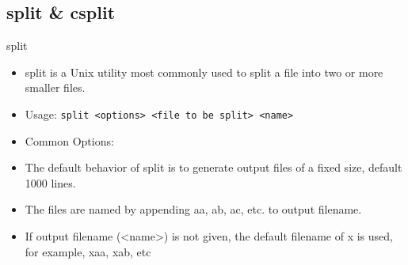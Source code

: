 \documentclass[slidestop,mathserif,compress,xcolor=svgnames]{beamer}
\begin{document}
\subsection{split \& csplit}
\begin{frame}{\small split}
  \begin{itemize}
    \item split is a Unix utility most commonly used to split a file into two or more smaller files.
    \item Usage: \texttt{split <options> <file to be split> <name>}
    \item Common Options:
    \item The default behavior of split is to generate output files of a fixed size, default 1000 lines. 
    \item The files are named by appending aa, ab, ac, etc. to output filename. 
    \item If output filename (<name>) is not given, the default filename of x is used, for example, xaa, xab, etc
  \end{itemize}
\end{frame}
\end{document}
